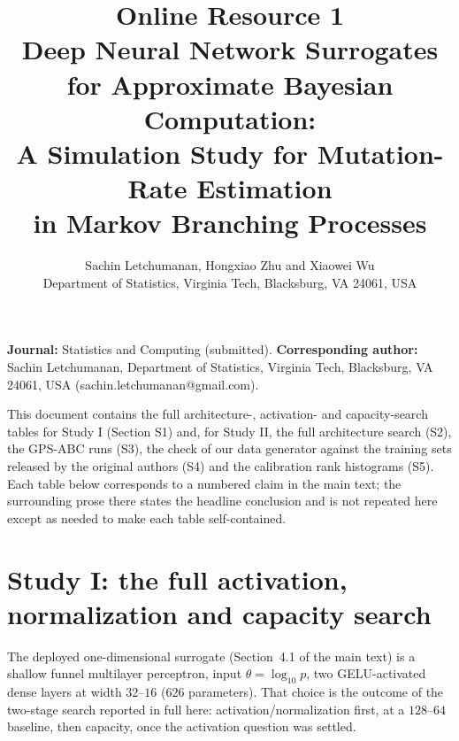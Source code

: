 \documentclass[11pt]{article}
\title{Online Resource 1\\
\large Deep Neural Network Surrogates for Approximate Bayesian Computation:\\
A Simulation Study for Mutation-Rate Estimation\\
in Markov Branching Processes}
\author{Sachin Letchumanan, Hongxiao Zhu and Xiaowei Wu\\\small Department of Statistics, Virginia Tech, Blacksburg, VA 24061, USA}
\date{}
\begin{document}
\maketitle

\noindent \textbf{Journal:} Statistics and Computing (submitted).
\textbf{Corresponding author:} Sachin Letchumanan, Department of Statistics, Virginia Tech, Blacksburg, VA 24061, USA (sachin.letchumanan\allowbreak @gmail.com).

\noindent This document contains the full architecture-, activation- and capacity-search tables for Study I
(Section S1) and, for Study II, the full architecture search (S2), the GPS-ABC runs (S3), the check of our
data generator against the training sets released by the original authors (S4) and the calibration rank
histograms (S5). Each table below corresponds to a numbered claim in the main text; the surrounding prose
there states the headline conclusion and is not repeated here except as needed to make each table self-contained.

\section{Study I: the full activation, normalization and capacity search}
\label{ssec:s1-1d-arch}

The deployed one-dimensional surrogate (Section~4.1 of the main text) is a
shallow funnel multilayer perceptron, input $\theta=\log_{10}p$, two
GELU-activated dense layers at width $32$--$16$ ($626$ parameters). That
choice is the outcome of the two-stage search reported in full here:
activation/normalization first, at a $128$--$64$ baseline, then capacity,
once the activation question was settled.

\begin{table}[h]
\centering
\caption{Architecture search, one-dimensional model: mean-curve fit MSE
against the denoised response curve (irreducible replicate-noise floor
$\approx 4.7\times 10^{-3}$).}
\label{stab:arch1D}
\end{table}
\end{document}
